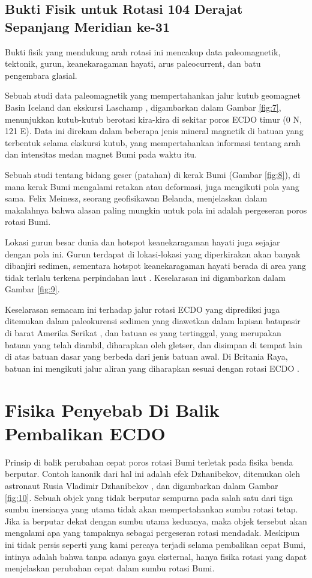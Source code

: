 \documentclass[10pt,twocolumn,letterpaper]{article}
\begin{document}
\subsection{Bukti Fisik untuk Rotasi 104 Derajat Sepanjang Meridian ke-31}

Bukti fisik yang mendukung arah rotasi ini mencakup data paleomagnetik, tektonik, gurun, keanekaragaman hayati, arus paleocurrent, dan batu pengembara glasial.

Sebuah studi data paleomagnetik yang mempertahankan jalur kutub geomagnet Basin Iceland dan ekskursi Laschamp \cite{35}, digambarkan dalam Gambar \ref{fig:7}, menunjukkan kutub-kutub berotasi kira-kira di sekitar poros ECDO timur (0 N, 121 E). Data ini direkam dalam beberapa jenis mineral magnetik di batuan yang terbentuk selama ekskursi kutub, yang mempertahankan informasi tentang arah dan intensitas medan magnet Bumi pada waktu itu.

Sebuah studi tentang bidang geser (patahan) di kerak Bumi (Gambar \ref{fig:8}), di mana kerak Bumi mengalami retakan atau deformasi, juga mengikuti pola yang sama. Felix Meinesz, seorang geofisikawan Belanda, menjelaskan dalam makalahnya \cite{36} bahwa alasan paling mungkin untuk pola ini adalah pergeseran poros rotasi Bumi.

Lokasi gurun besar dunia dan hotspot keanekaragaman hayati juga sejajar dengan pola ini. Gurun terdapat di lokasi-lokasi yang diperkirakan akan banyak dibanjiri sedimen, sementara hotspot keanekaragaman hayati berada di area yang tidak terlalu terkena perpindahan laut \cite{28}. Keselarasan ini digambarkan dalam Gambar \ref{fig:9}.

Keselarasan semacam ini terhadap jalur rotasi ECDO yang diprediksi juga ditemukan dalam paleokurensi sedimen yang diawetkan dalam lapisan batupasir di barat Amerika Serikat \cite{21}, dan batuan es yang tertinggal, yang merupakan batuan yang telah diambil, diharapkan oleh gletser, dan disimpan di tempat lain di atas batuan dasar yang berbeda dari jenis batuan awal. Di Britania Raya, batuan ini mengikuti jalur aliran yang diharapkan sesuai dengan rotasi ECDO \cite{67,68}.

\section{Fisika Penyebab Di Balik Pembalikan ECDO}

Prinsip di balik perubahan cepat poros rotasi Bumi terletak pada fisika benda berputar. Contoh kanonik dari hal ini adalah efek Dzhanibekov, ditemukan oleh astronaut Rusia Vladimir Dzhanibekov \cite{37}, dan digambarkan dalam Gambar \ref{fig:10}. Sebuah objek yang tidak berputar sempurna pada salah satu dari tiga sumbu inersianya yang utama tidak akan mempertahankan sumbu rotasi tetap. Jika ia berputar dekat dengan sumbu utama keduanya, maka objek tersebut akan mengalami apa yang tampaknya sebagai pergeseran rotasi mendadak. Meskipun ini tidak persis seperti yang kami percaya terjadi selama pembalikan cepat Bumi, intinya adalah bahwa tanpa adanya gaya eksternal, hanya fisika rotasi yang dapat menjelaskan perubahan cepat dalam sumbu rotasi Bumi.
\end{document}
